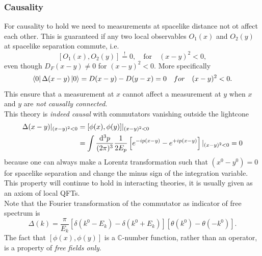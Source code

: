 \subsubsection{Causality}
For causality to hold we need to measurements at spacelike distance not ot affect each other. This is guaranteed if any two local observables $O_1(x)$ and $O_2(y)$ at spacelike separation commute, i.e. 
\begin{equation}
\left[O_1(x),O_2(y)\right] \stackrel{!}{=} 0, \quad \mathrm{for} \quad (x-y)^2 < 0,
\end{equation}
even though $D_F (x − y) \neq 0$ for $(x − y)^2 < 0$. More specifically
\begin{equation}
\bra{0} \Delta(x-y) \ket{0} = D(x-y) - D(y-x) =0 \quad for \quad (x-y)^2 <0.
\end{equation}
This ensure that a measurement at $x$ cannot affect a measurement at $y$ when $x$ and $y$ are \emph{not causally connected}.\\
This theory is \emph{indeed causal} with commutators vanishing outside the lightcone 
\begin{align}
	\Delta(x-y)|_{(x-y)^2<0} &= [\phi(x),\phi(y)] |_{(x-y)^2<0} \\
	&= \int \frac{\mathrm{d}^3 p}{(2 \pi)^3} \frac{1}{2 E_p} \left[e^{-ip(x-y)} - e^{+i p(x-y)} \right]|_{(x-y)^2<0}=0 \nonumber
\end{align}
because one can always make a Lorentz transformation such that $(x^0-y^0)=0$ for spacelike separation and change the minus sign of the integration variable.
This property will continue to hold in interacting theories, it is usually given as an axiom of local QFTs.\\
Note that the Fourier transformation of the commutator as indicator of free spectrum is
\begin{equation}
\Delta(k) = \frac{\pi}{E_k} \left[\delta(k^0-E_k)- \delta(k^0+E_k)\right]\left[\theta(k^0) - \theta(-k^0)\right].
\end{equation}
The fact that $[\phi(x),\phi(y)]$ is a $\mathbb{C}$-number function, rather than an operator, is a property of \emph{free fields only}.
